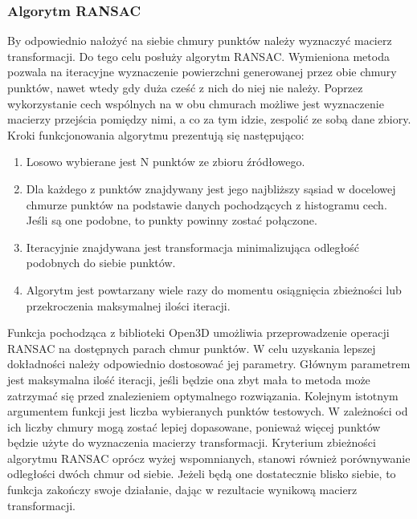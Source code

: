 \subsubsection{Algorytm RANSAC}
By odpowiednio nałożyć na siebie chmury punktów należy wyznaczyć macierz transformacji. Do tego celu posłuży algorytm RANSAC. Wymieniona metoda pozwala na iteracyjne wyznaczenie powierzchni generowanej przez obie chmury punktów, nawet wtedy gdy duża cześć z nich do niej nie należy. Poprzez wykorzystanie cech wspólnych na w obu chmurach możliwe jest wyznaczenie macierzy przejścia pomiędzy nimi, a co za tym idzie, zespolić ze sobą dane zbiory. Kroki funkcjonowania algorytmu prezentują się następująco:
\begin{enumerate}
    \item Losowo wybierane jest N punktów ze zbioru źródłowego.
    \item Dla każdego z punktów znajdywany jest jego najbliższy sąsiad w docelowej chmurze punktów na podstawie danych pochodzących z histogramu cech. Jeśli są one podobne, to punkty powinny zostać połączone.
    \item Iteracyjnie znajdywana jest transformacja minimalizująca odległość podobnych do siebie punktów.
    \item Algorytm jest powtarzany wiele razy do momentu osiągnięcia zbieżności lub przekroczenia maksymalnej ilości iteracji.
\end{enumerate}
\indent Funkcja pochodząca z biblioteki Open3D umożliwia przeprowadzenie operacji RANSAC na dostępnych parach chmur punktów. W celu uzyskania lepszej dokładności należy odpowiednio dostosować jej parametry. Głównym parametrem jest maksymalna ilość iteracji, jeśli będzie ona zbyt mała to metoda może zatrzymać się przed znalezieniem optymalnego rozwiązania. Kolejnym istotnym argumentem funkcji jest liczba wybieranych punktów testowych. W zależności od ich liczby chmury mogą zostać lepiej dopasowane, ponieważ więcej punktów będzie użyte do wyznaczenia macierzy transformacji. Kryterium zbieżności algorytmu RANSAC oprócz wyżej wspomnianych, stanowi również porównywanie odległości dwóch chmur od siebie. Jeżeli będą one dostatecznie blisko siebie, to funkcja zakończy swoje działanie, dając w rezultacie wynikową macierz transformacji.
